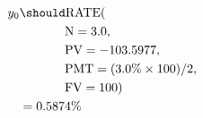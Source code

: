 \begin{align*}
y_{0}&\should\text{RATE}(\\
	&\hspace{.5in}\text{N}=3.0,\\
	&\hspace{.5in}\text{PV}=-103.5977,\\
	&\hspace{.5in}\text{PMT}=(3.0\%\times 100)/2,\\
	&\hspace{.5in}\text{FV}=100)\\
	&=0.5874\%
\end{align*}
